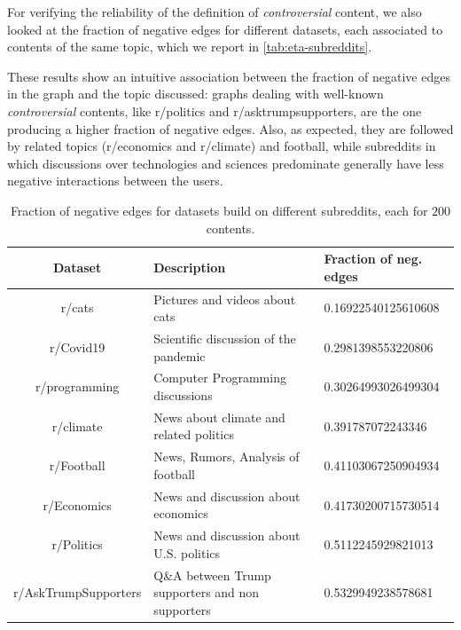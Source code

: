 \bigskip
For verifying the reliability of the definition of \emph{controversial}
content,
we also looked at the fraction of negative edges for different datasets, each
associated to contents of the same topic, which we report in
\autoref{tab:eta-subreddits}.

These results show an intuitive association between the fraction of negative edges in the
graph and the topic discussed:
graphs dealing with well-known \emph{controversial} contents, like r/politics and
r/asktrumpsupporters, are the one producing a higher fraction of negative
edges. Also, as expected, they are followed by related topics
(r/economics and r/climate) and football, while
subreddits in which discussions over technologies and sciences
predominate generally have less negative interactions between the users.

\begin{table}
	\centering
	\caption[Fraction of negative edges in different subreddits]{Fraction of negative edges for datasets build on different
		subreddits, each for $200$ contents.}
	\label{tab:eta-subreddits}
	{\small
		\begin{tabular}{|c p{6cm} p{2cm} |}
			\toprule
			Dataset              & Description                               &
			Fraction of neg. edges                                                                       \\
			\midrule
			r/cats               & Pictures and videos about cats            & \num{0.16922540125610608} \\
			r/Covid19            & Scientific discussion of the pandemic     & \num{0.2981398553220806}  \\
			r/programming        & Computer Programming discussions          & \num{0.30264993026499304} \\
			r/climate            & News about climate and related politics   & \num{0.391787072243346}   \\
			r/Football           & News, Rumors, Analysis of \mbox{football} & \num{0.41103067250904934} \\
			r/Economics          & News and discussion about economics       & \num{0.41730200715730514} \\
			r/Politics           & News and discussion about U.S. politics   & \num{0.5112245929821013}  \\
			r/AskTrumpSupporters & {Q\&A between Trump supporters and non
			supporters}          & \num{0.5329949238578681}                                              \\
			\bottomrule
		\end{tabular}
	}
\end{table}

